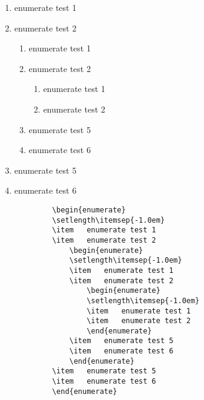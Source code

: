 			\begin{enumerate}
			\setlength\itemsep{-1.0em}
			\item	enumerate test 1
			\item	enumerate test 2
				\begin{enumerate}
				\setlength\itemsep{-1.0em}
				\item	enumerate test 1
				\item	enumerate test 2
					\begin{enumerate}
					\setlength\itemsep{-1.0em}
					\item	enumerate test 1
					\item	enumerate test 2
					\end{enumerate}
				\item	enumerate test 5
				\item	enumerate test 6
				\end{enumerate}
			\item	enumerate test 5
			\item	enumerate test 6
			\end{enumerate}
		


		\begin{mdframed}[style=code_document, frametitle={code}]
			\begin{verbatim}
			\begin{enumerate}
			\setlength\itemsep{-1.0em}
			\item	enumerate test 1
			\item	enumerate test 2
				\begin{enumerate}
				\setlength\itemsep{-1.0em}
				\item	enumerate test 1
				\item	enumerate test 2
					\begin{enumerate}
					\setlength\itemsep{-1.0em}
					\item	enumerate test 1
					\item	enumerate test 2
					\end{enumerate}
				\item	enumerate test 5
				\item	enumerate test 6
				\end{enumerate}
			\item	enumerate test 5
			\item	enumerate test 6
			\end{enumerate}
			\end{verbatim}
		\end{mdframed}


